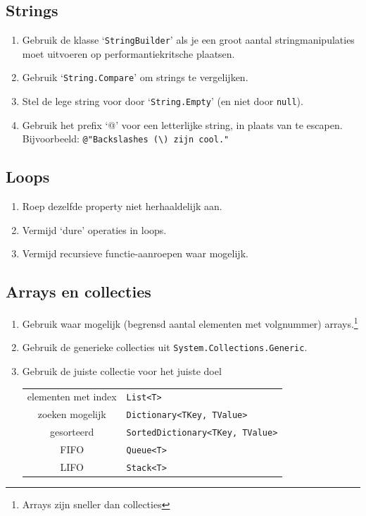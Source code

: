 \documentclass[a4paper,11pt]{article}
\begin{document}
\subsection{Strings}

\begin{enumerate}[resume]
\item Gebruik de klasse `\lstinline !StringBuilder!' als je een groot aantal stringmanipulaties
moet uitvoeren op performantiekritsche plaatsen.
\item Gebruik `\lstinline !String.Compare!' om strings te vergelijken.
\item Stel de lege string voor door `\lstinline !String.Empty!' (en niet door \lstinline !null!).
\item Gebruik het prefix `@' voor een letterlijke string, in plaats van te escapen.
Bijvoorbeeld: \lstinline !@"Backslashes (\) zijn cool."!
\end{enumerate}

\subsection{Loops}

\begin{enumerate}[resume]
\item Roep dezelfde property niet herhaaldelijk aan.
\item Vermijd `dure' operaties in loops.
\item Vermijd recursieve functie-aanroepen waar mogelijk.
\end{enumerate}

\subsection{Arrays en collecties}

\begin{enumerate}[resume]
\item Gebruik waar mogelijk (begrensd aantal elementen met volgnummer) arrays.\footnote{Arrays zijn sneller dan collecties}
\item Gebruik de generieke collecties uit \lstinline !System.Collections.Generic!.
\item Gebruik de juiste collectie voor het juiste doel

\begin{tabular}{|c|l|}
\hline
elementen met index & \lstinline !List<T>! \\
zoeken mogelijk & \lstinline !Dictionary<TKey, TValue>! \\
gesorteerd & \lstinline !SortedDictionary<TKey, TValue>! \\
FIFO & \lstinline !Queue<T>! \\
LIFO & \lstinline !Stack<T>! \\
\hline
\end{tabular}
\end{enumerate}
\end{document}

